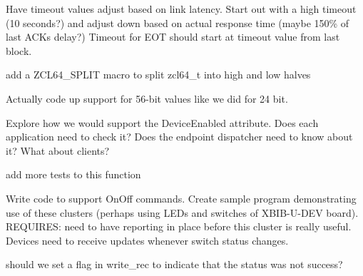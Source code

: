 \begin{DoxyRefList}
\item[\label{todo__todo000012}%
\Hypertarget{todo__todo000012}%
File \hyperlink{xbee__xmodem_8c}{xbee\+\_\+xmodem.c} ]Have timeout values adjust based on link latency. Start out with a high timeout (10 seconds?) and adjust down based on actual response time (maybe 150\% of last A\+CK\textquotesingle{}s delay?) Timeout for E\+OT should start at timeout value from last block.  
\item[\label{todo__todo000031}%
\Hypertarget{todo__todo000031}%
File \hyperlink{zcl64_8h}{zcl64.h} ]add a Z\+C\+L64\+\_\+\+S\+P\+L\+IT macro to split zcl64\+\_\+t into high and low halves  
\item[\label{todo__todo000032}%
\Hypertarget{todo__todo000032}%
Global \hyperlink{group__zcl__64_ga2e906cb47fc172ae60da5178075dd3c7}{zcl64\+\_\+t} ]Actually code up support for 56-\/bit values like we did for 24 bit.  
\item[\label{todo__todo000033}%
\Hypertarget{todo__todo000033}%
File \hyperlink{zcl__basic_8h}{zcl\+\_\+basic.h} ]Explore how we would support the Device\+Enabled attribute. Does each application need to check it? Does the endpoint dispatcher need to know about it? What about clients?  
\item[\label{todo__todo000016}%
\Hypertarget{todo__todo000016}%
Global \hyperlink{group__zcl__commissioning_ga91a578cd65163c738bd57a4249955c05}{zcl\+\_\+comm\+\_\+sas\+\_\+is\+\_\+valid} (const \hyperlink{structzcl__comm__state__t}{zcl\+\_\+comm\+\_\+state\+\_\+t} F\+AR $\ast$comm)]add more tests to this function  
\item[\label{todo__todo000034}%
\Hypertarget{todo__todo000034}%
File \hyperlink{zcl__onoff_8h}{zcl\+\_\+onoff.h} ]Write code to support On\+Off commands. Create sample program demonstrating use of these clusters (perhaps using L\+E\+Ds and switches of X\+B\+I\+B-\/\+U-\/\+D\+EV board). R\+E\+Q\+U\+I\+R\+ES\+: need to have reporting in place before this cluster is really useful. Devices need to receive updates whenever switch status changes.  
\item[\label{todo__todo000020}%
\Hypertarget{todo__todo000020}%
Global \hyperlink{group__zcl_ga9f9ac99001185554fe24dc7b09c0b0b0}{zcl\+\_\+parse\+\_\+attribute\+\_\+record} (const \hyperlink{structzcl__attribute__base__t}{zcl\+\_\+attribute\+\_\+base\+\_\+t} F\+AR $\ast$entry, \hyperlink{structzcl__attribute__write__rec__t}{zcl\+\_\+attribute\+\_\+write\+\_\+rec\+\_\+t} $\ast$write\+\_\+rec)]should we set a flag in write\+\_\+rec to indicate that the status was not success?  

\end{DoxyRefList}
